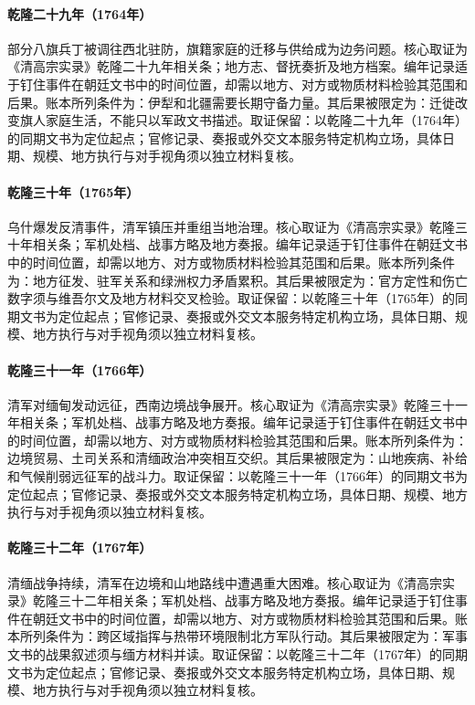 \hypertarget{ledger:EQ-1764-MANCHU-BANNER-RESETTLEMENT}{}\paragraph{乾隆二十九年（1764年）}部分八旗兵丁被调往西北驻防，旗籍家庭的迁移与供给成为边务问题。核心取证为《清高宗实录》乾隆二十九年相关条；地方志、督抚奏折及地方档案。编年记录适于钉住事件在朝廷文书中的时间位置，却需以地方、对方或物质材料检验其范围和后果。账本所列条件为：伊犁和北疆需要长期守备力量。其后果被限定为：迁徙改变旗人家庭生活，不能只以军政文书描述。取证保留：以乾隆二十九年（1764年）的同期文书为定位起点；官修记录、奏报或外交文本服务特定机构立场，具体日期、规模、地方执行与对手视角须以独立材料复核。
\hypertarget{ledger:EQ-1765-USH-REBELLION}{}\paragraph{乾隆三十年（1765年）}乌什爆发反清事件，清军镇压并重组当地治理。核心取证为《清高宗实录》乾隆三十年相关条；军机处档、战事方略及地方奏报。编年记录适于钉住事件在朝廷文书中的时间位置，却需以地方、对方或物质材料检验其范围和后果。账本所列条件为：地方征发、驻军关系和绿洲权力矛盾累积。其后果被限定为：官方定性和伤亡数字须与维吾尔文及地方材料交叉检验。取证保留：以乾隆三十年（1765年）的同期文书为定位起点；官修记录、奏报或外交文本服务特定机构立场，具体日期、规模、地方执行与对手视角须以独立材料复核。
\hypertarget{ledger:EQ-1766-BURMA-WAR-BEGIN}{}\paragraph{乾隆三十一年（1766年）}清军对缅甸发动远征，西南边境战争展开。核心取证为《清高宗实录》乾隆三十一年相关条；军机处档、战事方略及地方奏报。编年记录适于钉住事件在朝廷文书中的时间位置，却需以地方、对方或物质材料检验其范围和后果。账本所列条件为：边境贸易、土司关系和清缅政治冲突相互交织。其后果被限定为：山地疾病、补给和气候削弱远征军的战斗力。取证保留：以乾隆三十一年（1766年）的同期文书为定位起点；官修记录、奏报或外交文本服务特定机构立场，具体日期、规模、地方执行与对手视角须以独立材料复核。
\hypertarget{ledger:EQ-1767-BURMA-CAMPAIGN}{}\paragraph{乾隆三十二年（1767年）}清缅战争持续，清军在边境和山地路线中遭遇重大困难。核心取证为《清高宗实录》乾隆三十二年相关条；军机处档、战事方略及地方奏报。编年记录适于钉住事件在朝廷文书中的时间位置，却需以地方、对方或物质材料检验其范围和后果。账本所列条件为：跨区域指挥与热带环境限制北方军队行动。其后果被限定为：军事文书的战果叙述须与缅方材料并读。取证保留：以乾隆三十二年（1767年）的同期文书为定位起点；官修记录、奏报或外交文本服务特定机构立场，具体日期、规模、地方执行与对手视角须以独立材料复核。
